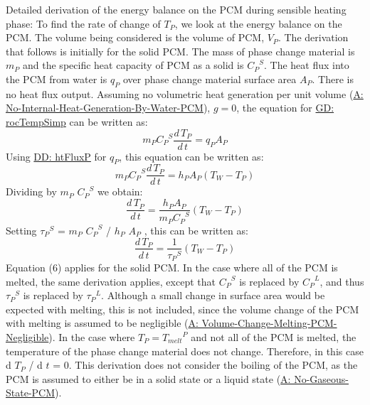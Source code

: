 \documentclass[12pt]{article}
\begin{document}
Detailed derivation of the energy balance on the PCM during  sensible heating phase:
To find the rate of change of ${T_{P}}$, we look at the energy balance on the PCM. The volume being considered is the volume of PCM, ${V_{P}}$. The derivation that follows is initially for the solid PCM. The mass of phase change material is ${m_{P}}$ and the specific heat capacity of PCM as a solid is ${{C_{P}}^{S}}$. The heat flux into the PCM from water is ${q_{P}}$ over phase change material surface area ${A_{P}}$. There is no heat flux output. Assuming no volumetric heat generation per unit volume (\hyperref[assumpNIHGBWP]{A: No-Internal-Heat-Generation-By-Water-PCM}), $g=0$, the equation for \hyperref[GD:rocTempSimp]{GD: rocTempSimp} can be written as:
\begin{displaymath}
{m_{P}} {{C_{P}}^{S}} \frac{d\,{T_{P}}}{d\,t}={q_{P}} {A_{P}}
\end{displaymath}
Using \hyperref[DD:htFluxP]{DD: htFluxP} for ${q_{P}}$, this equation can be written as:
\begin{displaymath}
{m_{P}} {{C_{P}}^{S}} \frac{d\,{T_{P}}}{d\,t}={h_{P}} {A_{P}} \left({T_{W}}-{T_{P}}\right)
\end{displaymath}
Dividing by ${m_{P}}$ ${{C_{P}}^{S}}$ we obtain:
\begin{displaymath}
\frac{d\,{T_{P}}}{d\,t}=\frac{{h_{P}} {A_{P}}}{{m_{P}} {{C_{P}}^{S}}} \left({T_{W}}-{T_{P}}\right)
\end{displaymath}
Setting ${{τ_{P}}^{S}}$ = ${m_{P}}$ ${{C_{P}}^{S}}$ / ${h_{P}}$ ${A_{P}}$ , this can be written as:
\begin{displaymath}
\frac{d\,{T_{P}}}{d\,t}=\frac{1}{{{τ_{P}}^{S}}} \left({T_{W}}-{T_{P}}\right)
\end{displaymath}
Equation (6) applies for the solid PCM. In the case where all of the PCM is melted, the same derivation applies, except that ${{C_{P}}^{S}}$ is replaced by ${{C_{P}}^{L}}$, and thus ${{τ_{P}}^{S}}$ is replaced by ${{τ_{P}}^{L}}$. Although a small change in surface area would be expected with melting, this is not included, since the volume change of the PCM with melting is assumed to be negligible (\hyperref[assumpVCMPN]{A: Volume-Change-Melting-PCM-Negligible}).
In the case where ${T_{P}}={{T_{melt}}^{P}}$ and not all of the PCM is melted, the temperature of the phase change material does not change. Therefore, in this case d ${T_{P}}$ / d $t$ = 0.
This derivation does not consider the boiling of the PCM, as the PCM is assumed to either be in a solid state or a liquid state (\hyperref[assumpNGSP]{A: No-Gaseous-State-PCM}).
\par~
\end{document}
